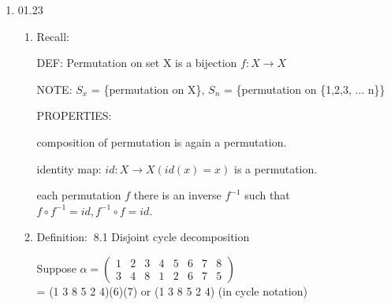 \documentclass[12pt]{article}
\newcommand{\defi}{{\color{blue} Definition: $\ $}}
\newcommand{\recall}{{\color{blue} Recall: $\ $}}
\newcommand{\Z}{\mathbf{Z}}
\begin{document}
\begin{enumerate}
\begin{enumerate}
\begin{proof}
        Let $[x]_8 = [x']_8 \\ \Rightarrow x \equiv x' (mod \ 8) \\ \Rightarrow 8|(x - x') \\ \Rightarrow x - x' = 8*q $ for some $q \in \Z$ \\
        $x = 8\cdot q + x'$

        By definition of $g$, $g([x]_8) = [6x]_{12}$\\
        Then, $g([x]_8) = [6(8q+x')]_{12} = [48q + 6x']_{12}, g([x']_8) = [6x']_{12}$\\
        WTS $[48q + 6x']_{12} = [6x']_{12}$\\
        Enough to show: $12 | (48q + 6x' - 6x')$\\
        Since $48q + 6x' - 6x' = 48 q = 12 \cdot 4 \cdot q$\\
        $\Rightarrow 12 | 12 \cdot 4 \cdot q$\\
        $\Rightarrow 12 | (48q + 6x' - 6x')$ \\
        $\Rightarrow g([x]_8) = g([x']_8)$
        \end{proof}
    \end{enumerate}
    \item 01.23
    \begin{enumerate}
        \item \recall
    
        DEF: Permutation on set X is a bijection $f: X \rightarrow X$

        NOTE: $S_x$ = \{permutation on X\}, $S_n$ = \{permutation on \{1,2,3, ... n\}\}

        PROPERTIES: 
        
        composition of permutation is again a permutation.

        identity map: $id: X \rightarrow X (id(x) = x)$ is a permutation.

        each permutation $f$ there is an inverse $f^{-1}$ such that $f \circ f^{-1} = id, f^{-1} \circ f = id$.

        \item \defi 8.1 Disjoint cycle decomposition
    
        Suppose $\alpha = \begin{pmatrix}
            1 & 2 & 3 & 4 & 5 & 6 & 7 & 8 \\
            3 & 4 & 8 & 1 & 2 & 6 & 7 & 5
        \end{pmatrix}$ \\= (1 3 8 5 2 4)(6)(7) or (1 3 8 5 2 4) (in cycle notation)
    

\end{enumerate}
\end{enumerate}
\end{document}
